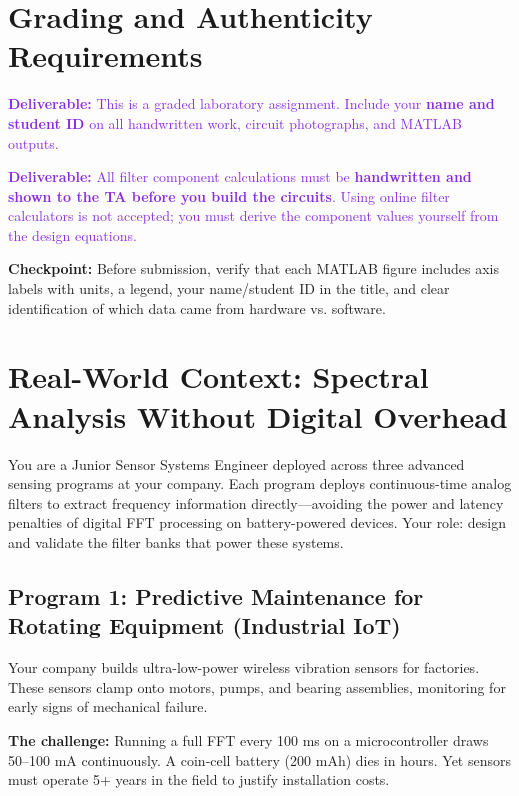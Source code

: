 \documentclass[11pt,letterpaper]{article}
\providecommand{\cpECE}[1]{\textcolor{OliveGreen}{\textbf{Checkpoint:} #1}}
\providecommand{\delECE}[1]{\textcolor{BlueViolet}{\textbf{Deliverable:} #1}}
\begin{document}
\clearpage

\section*{Grading and Authenticity Requirements}
\delECE{This is a graded laboratory assignment. Include your \textbf{name and student ID} on all handwritten work, circuit photographs, and MATLAB outputs.}

\delECE{All filter component calculations must be \textbf{handwritten and shown to the TA before you build the circuits}. Using online filter calculators is not accepted; you must derive the component values yourself from the design equations.}

\cpECE{Before submission, verify that each MATLAB figure includes axis labels with units, a legend, your name/student ID in the title, and clear identification of which data came from hardware vs. software.}

\clearpage

\section{Real-World Context: Spectral Analysis Without Digital Overhead}

\noindent
You are a Junior Sensor Systems Engineer deployed across three advanced sensing programs at your company. Each program deploys continuous-time analog filters to extract frequency information directly—avoiding the power and latency penalties of digital FFT processing on battery-powered devices. Your role: design and validate the filter banks that power these systems.

\subsection{Program 1: Predictive Maintenance for Rotating Equipment (Industrial IoT)}

Your company builds ultra-low-power wireless vibration sensors for factories. These sensors clamp onto motors, pumps, and bearing assemblies, monitoring for early signs of mechanical failure.

\textbf{The challenge:} Running a full FFT every 100 ms on a microcontroller draws 50--100 mA continuously. A coin-cell battery (200 mAh) dies in hours. Yet sensors must operate 5+ years in the field to justify installation costs.
\end{document}
